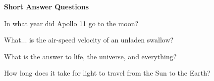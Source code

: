 \documentclass[10pt,addpoints]{exam}
\begin{document}
\begin{questions}
\begin{minipage}{\linewidth}
\begin{solutionbox}{0in}
\end{solutionbox}
\end{minipage}





\newpage
\begin{center}
{\Large \textbf{Short Answer Questions}}
\end{center}

\par\vspace{0.100000in}\begin{minipage}{\linewidth}
\vspace{.35cm}\question[2]
In what year did Apollo 11 go to the moon?
\vspace{.25cm}\setlength\answerlinelength{3in}
\answerline[1969]
\end{minipage}


\par\vspace{0.100000in}\begin{minipage}{\linewidth}
\vspace{.35cm}\question[2]
What... is the air-speed velocity of an unladen swallow?
\vspace{.25cm}\setlength\answerlinelength{3in}
\end{minipage}


\par\vspace{0.100000in}\begin{minipage}{\linewidth}
\vspace{.35cm}\question[2]
What is the answer to life, the universe, and everything?
\vspace{.25cm}\setlength\answerlinelength{3in}
\answerline[42]
\end{minipage}


\par\vspace{0.100000in}\begin{minipage}{\linewidth}
\vspace{.35cm}\question[2]
How long does it take for light to travel from the Sun to the Earth?
\vspace{.25cm}\setlength\answerlinelength{3in}
\answerline[8 minutes]
\end{minipage}



\end{questions}
\end{document}
